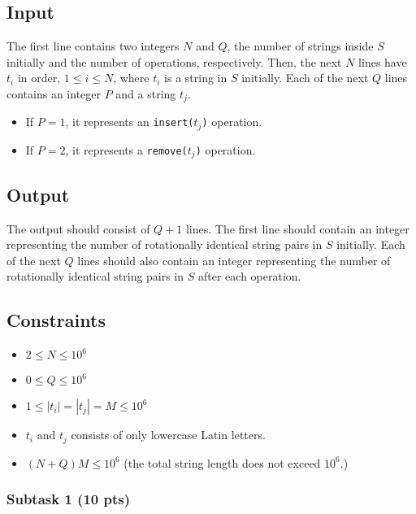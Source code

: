 \subsection{Input}\label{input}

The first line contains two integers $N$ and $Q$, the number of strings inside $S$ initially and the number of operations, respectively. Then, the next $N$ lines have $t_i$ in order, $1 \leq i \leq N$, where $t_i$ is a string in $S$ initially. Each of the next $Q$ lines contains an integer $P$ and a string $t_j$. 

\begin{itemize}
    \item If $P = 1$, it represents an \verb|insert(|$t_j$\verb|)| operation.
    \item If $P = 2$, it represents a \verb|remove(|$t_j$\verb|)| operation.
\end{itemize}

\subsection{Output}\label{output}

The output should consist of $Q+1$ lines. The first line should contain an integer representing the number of rotationally identical string pairs in $S$ initially. Each of the next $Q$ lines should also contain an integer representing the number of rotationally identical string pairs in $S$ after each operation. 

\subsection{Constraints} \label{constraint}
\begin{itemize}
\tightlist
    \item $2 \le N \le 10^6$
    \item $0 \le Q \le 10^6$
    \item $1 \le |t_i| = |t_j| = M \le 10^6$
    \item $t_i$ and $t_j$ consists of only lowercase Latin letters.
    \item $(N+Q)M \le 10^6$ (the total string length does not exceed $10^6$.)
\end{itemize}

\subsubsection{Subtask 1 (10 pts)}\label{subtask-1}

